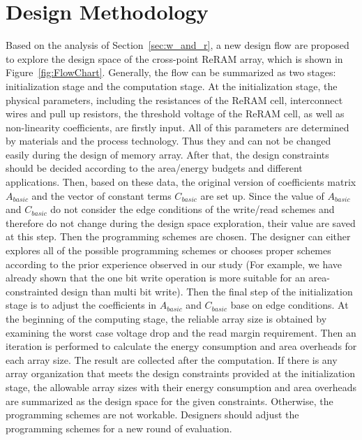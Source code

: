 \vspace{10pt}
\section{Design Methodology}\label{sec:framwork}
Based on the analysis of Section~\ref{sec:w_and_r}, a new design flow are proposed to explore the design space of the cross-point ReRAM array, which  is shown in Figure~\ref{fig:FlowChart}. Generally, the flow can be summarized as two stages: initialization stage and the computation stage. At the initialization stage, the physical parameters, including the resistances of the ReRAM cell, interconnect wires and pull up resistors, the threshold voltage of the ReRAM cell, as well as non-linearity coefficients, are firstly input. All of this parameters are determined by materials and the process technology. Thus they and can not be changed easily during the design of memory array. After that, the design constraints should be decided according to the area/energy budgets and different applications. Then, based on these data, the original version of coefficients matrix $A_{basic}$ and the vector of constant terms $C_{basic}$ are set up. Since the value of $A_{basic}$ and $C_{basic}$ do not consider the edge conditions of the write/read schemes and therefore do not change during the design space exploration, their value are saved at this step. Then the programming schemes are chosen. The designer can either explores all of the possible programming schemes or chooses proper schemes according to the prior experience observed in our study (For example, we have already shown that the one bit write operation is more suitable for an area-constrainted design than multi bit write). Then the final step of the initialization stage is to adjust the coefficients in $A_{basic}$ and $C_{basic}$ base on edge conditions. At the beginning of the computing stage, the reliable array size is obtained by examining the worst case voltage drop and the read margin requirement. Then an iteration is performed to calculate the energy consumption and area overheads for each array size. The result are collected after the computation. If there is any array organization that meets the design constraints provided at   the initialization stage, the allowable array sizes with their energy consumption and area overheads are summarized as the design space for the given constraints. Otherwise, the programming schemes are not workable. Designers should adjust the programming schemes for a new round of evaluation.




